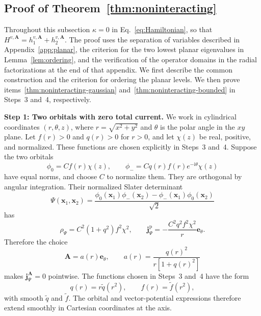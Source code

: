 \documentclass[11pt,a4paper]{article}
\theoremstyle{remark}
\theoremstyle{plain}
\newcommand{\jp}{\mathbf j^{\mathrm p}}
\newcommand{\jj}{\mathbf j}
\newcommand{\A}{\mathbf A}
\newcommand{\ee}{\mathbf e_\theta}
\begin{document}
\subsection{Proof of Theorem~\ref{thm:noninteracting}}
\label{sec:noninteracting-proof}

Throughout this subsection $\kappa=0$ in Eq.~\eqref{eq:Hamiltonian}, so that
$H^{v,\A}=h_1^{v,\A}+h_2^{v,\A}$.
The proof uses the separation of variables described in
Appendix~\ref{app:planar}, the criterion for the two lowest planar
eigenvalues in Lemma~\ref{lem:ordering}, and the verification of the
operator domains in the radial factorizations at the end of that appendix.
We first describe the common
construction and the criterion for ordering the planar levels. We then
prove items~\ref{thm:noninteracting-gaussian}
and~\ref{thm:noninteracting-bounded} in Steps~3 and~4, respectively.

\noindent\textbf{Step 1: Two orbitals with zero total current.}
We work in cylindrical coordinates $(r,\theta,z)$, where
$r=\sqrt{x^2+y^2}$ and $\theta$ is the polar angle in the $xy$ plane.
Let $f(r)>0$ and $q(r)>0$ for $r>0$, and let $\chi(z)$ be real,
positive, and normalized. These functions are chosen explicitly in
Steps~3 and~4. Suppose the two orbitals
\begin{equation}
 \phi_0=Cf(r)\chi(z),\qquad
 \phi_-=Cq(r)f(r)e^{-\mathrm{i}\theta}\chi(z)
 \label{eq:ansatz}
\end{equation}
have equal norms, and choose $C$ to normalize them. They are
orthogonal by angular integration. Their normalized Slater determinant
\begin{equation}
 \Psi(\mathbf x_1,\mathbf x_2)=
 \frac{\phi_0(\mathbf x_1)\phi_-(\mathbf x_2)
       -\phi_-(\mathbf x_1)\phi_0(\mathbf x_2)}{\sqrt2}
 \label{eq:slater}
\end{equation}
has
\begin{equation*}
 \rho_\Psi=C^2(1+q^2)f^2\chi^2,\qquad
 \jp_\Psi=-\frac{C^2q^2f^2\chi^2}{r}\ee.
\end{equation*}
Therefore the choice
\begin{equation}
 \A=a(r)\ee,\qquad
 a(r)=\frac{q(r)^2}{r[1+q(r)^2]}
 \label{eq:cancellation}
\end{equation}
makes $\jj_\Psi^{\A}=0$ pointwise. The functions chosen in
Steps~3 and~4 have the form
\begin{equation*}
 q(r)=r\tilde q(r^2),\qquad f(r)=\tilde f(r^2),
\end{equation*}
with smooth $\tilde q$ and $\tilde f$. The orbital and vector-potential
expressions therefore extend smoothly in Cartesian coordinates at the axis.
\end{document}
